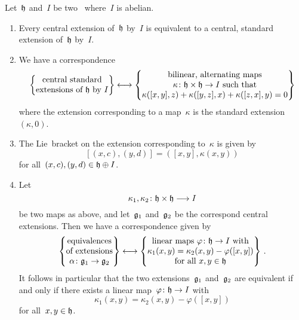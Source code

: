 \begin{theorem}
  \label{structure of central extensions}
  Let~$\mathfrak{h}$ and~$I$ be two~\liealgebras{$\kf$} where~$I$ is abelian.
  \begin{enumerate}
    \item
      Every central extension of~$\mathfrak{h}$ by~$I$ is equivalent to a central, standard extension of~$\mathfrak{h}$ by~$I$.
    \item
      We have a {\onetoonetext} correspondence
      \[
        \left\{
          \begin{tabular}{@{}c@{}}
            central standard \\
            extensions of~$\hlie$ by~$I$
          \end{tabular}
        \right\}
        \onetoone
        \left\{
          \begin{tabular}{@{}c@{}}
            bilinear, alternating maps \\
            $\kappa \colon \hlie \times \hlie \to I$ such that \\
            $\kappa([x,y], z) + \kappa([y,z], x) + \kappa([z, x], y) = 0$
          \end{tabular}
        \right\}
      \]
      where the extension corresponding to a map~$\kappa$ is the standard extension~$(\kappa, 0)$.
    \item
      The Lie~bracket on the extension corresponding to~$\kappa$ is given by
      \[
        [ (x,c), (y,d) ]
        =
        ( [x,y], \kappa(x,y) )
      \]
      for all~$(x,c), (y,d) \in \mathfrak{h} \oplus I$.
    \item
      Let
      \[
        \kappa_1, \kappa_2
        \colon
        \hlie \times \hlie
        \to
        I
      \]
      be two maps as above, and let~$\mathfrak{g}_1$ and~$\mathfrak{g}_2$ be the correspond central extensions.
      Then we have a {\onetoonetext} correspondence given by
      \[
        \left\{
          \begin{tabular}{@{}c@{}}
            equivalences \\ of extensions \\
            $\alpha \colon \glie_1 \to \glie_2$
          \end{tabular}
        \right\}
        \onetoone
        \left\{
          \begin{tabular}{@{}c@{}}
            linear maps~$\varphi \colon \hlie \to I$ with \\
            $\kappa_1(x,y) = \kappa_2(x,y) - \varphi([x,y])$ \\
            for all~$x, y \in \hlie$
          \end{tabular}
        \right\} \,.
      \]
      It follows in particular that the two extensions~$\mathfrak{g}_1$ and~$\mathfrak{g}_2$ are equivalent if and only if there exists a linear map~$\varphi \colon \hlie \to I$ with
      \[
        \kappa_1(x,y)
        =
        \kappa_2(x,y)
        -
        \varphi([x,y])
      \]
      for all~$x, y \in \mathfrak{h}$.
  \end{enumerate}
\end{theorem}


